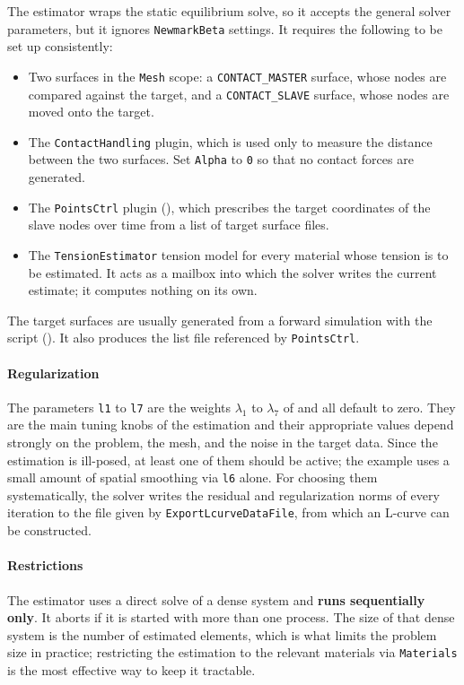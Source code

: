 The estimator wraps the static equilibrium solve, so it accepts the general solver parameters, but it ignores \verb|NewmarkBeta| settings.
It requires the following to be set up consistently:
\begin{itemize}
    \item
    Two surfaces in the \verb|Mesh| scope: a \verb|CONTACT_MASTER| surface, whose nodes are compared against the target, and a \verb|CONTACT_SLAVE| surface, whose nodes are moved onto the target.
    \item
    The \verb|ContactHandling| plugin, which is used only to measure the distance between the two surfaces. Set \verb|Alpha| to \verb|0| so that no contact forces are generated.
    \item
    The \verb|PointsCtrl| plugin (), which prescribes the target coordinates of the slave nodes over time from a list of target surface files.
    \item
    The \verb|TensionEstimator| tension model for every material whose tension is to be estimated. It acts as a mailbox into which the solver writes the current estimate; it computes nothing on its own.
\end{itemize}

The target surfaces are usually generated from a forward simulation with the  script ().
It also produces the list file referenced by \verb|PointsCtrl|.

\paragraph{Regularization}
The parameters \verb|l1| to \verb|l7| are the weights $\lambda_1$ to $\lambda_7$ of  and all default to zero.
They are the main tuning knobs of the estimation and their appropriate values depend strongly on the problem, the mesh, and the noise in the target data.
Since the estimation is ill-posed, at least one of them should be active; the example uses a small amount of spatial smoothing via \verb|l6| alone.
For choosing them systematically, the solver writes the residual and regularization norms of every iteration to the file given by \verb|ExportLcurveDataFile|, from which an L-curve can be constructed.

\paragraph{Restrictions}
The estimator uses a direct solve of a dense system and \textbf{runs sequentially only}.
It aborts if it is started with more than one process.
The size of that dense system is the number of estimated elements, which is what limits the problem size in practice; restricting the estimation to the relevant materials via \verb|Materials| is the most effective way to keep it tractable.

